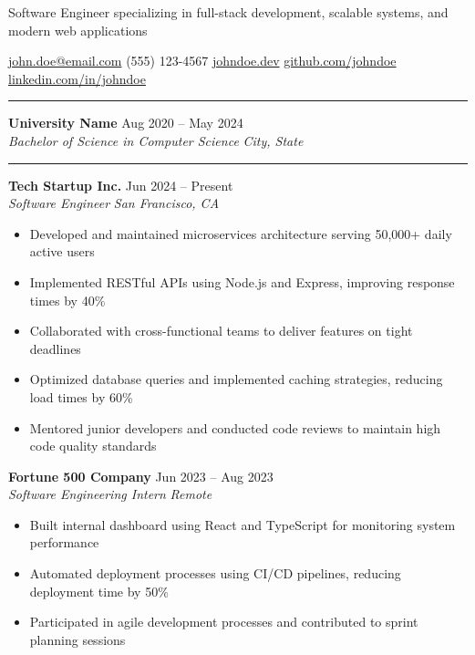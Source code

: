 \documentclass[11pt]{article}
\newcommand{\name}[1]{\begingroup\centering{\LARGE\bfseries #1\par}\endgroup\vspace{-2pt}}
\newcommand{\tagline}[1]{\begingroup\centering #1\par\endgroup\vspace{-1pt}}
\newcommand{\contact}[1]{\begingroup\centering #1\par\endgroup}
\newcommand{\sectionhead}[1]{\vspace{0.4em}\noindent{\large\bfseries #1}\vspace{0.15em}\hrule\vspace{0.4em}}
\newcommand{\daterange}[1]{\hfill {\small #1}}
\newcommand{\role}[1]{\emph{#1}}
\newenvironment{tightitemize}{\begin{itemize}[leftmargin=1.5em,topsep=0pt,itemsep=1pt,parsep=0pt,partopsep=0pt]}{\end{itemize}}
\begin{document}
\name{John Doe}
\tagline{Software Engineer specializing in full-stack development, scalable systems, and modern web applications}
\contact{\href{mailto:john.doe@email.com}{john.doe@email.com} \textbar{} (555) 123-4567 \textbar{} \href{https://johndoe.dev}{johndoe.dev} \textbar{} \href{https://github.com/johndoe}{github.com/johndoe} \textbar{} \href{https://www.linkedin.com/in/johndoe}{linkedin.com/in/johndoe}}

\sectionhead{Education}
\noindent\textbf{University Name} \daterange{Aug 2020 -- May 2024}\\
\emph{Bachelor of Science in Computer Science} \daterange{\emph{City, State}}

\sectionhead{Experience}
\noindent\textbf{Tech Startup Inc.} \daterange{Jun 2024 -- Present}\\
\role{Software Engineer} \daterange{\emph{San Francisco, CA}}
\begin{tightitemize}
  \item Developed and maintained microservices architecture serving 50,000+ daily active users
  \item Implemented RESTful APIs using Node.js and Express, improving response times by 40\%
  \item Collaborated with cross-functional teams to deliver features on tight deadlines
  \item Optimized database queries and implemented caching strategies, reducing load times by 60\%
  \item Mentored junior developers and conducted code reviews to maintain high code quality standards
\end{tightitemize}

\vspace{0.3em}
\noindent\textbf{Fortune 500 Company} \daterange{Jun 2023 -- Aug 2023}\\
\role{Software Engineering Intern} \daterange{\emph{Remote}}
\begin{tightitemize}
  \item Built internal dashboard using React and TypeScript for monitoring system performance
  \item Automated deployment processes using CI/CD pipelines, reducing deployment time by 50\%
  \item Participated in agile development processes and contributed to sprint planning sessions
\end{tightitemize}
\end{document}
